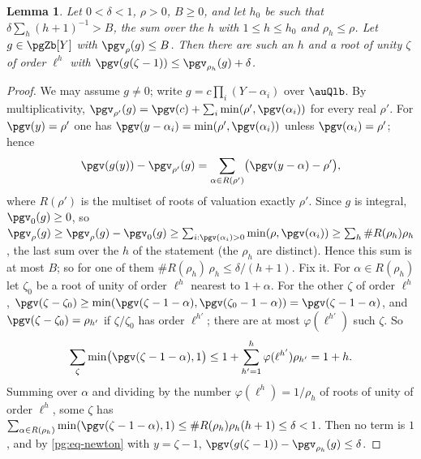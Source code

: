 \documentclass[10pt]{amsart}
\newtheorem{lemma}[theorem]{Lemma}
\theoremstyle{definition}
\theoremstyle{remark}
\begin{document}
\begin{lemma}\label{pg:roots1}
Let $0<\delta<1$, $\rho>0$, $B\ge0$, and let $h_0$ be such that $\delta\sum_h(h+1)^{-1}>B$, the
sum over the $h$ with $1\le h\le h_0$ and $\rho_h\le\rho$. Let $g\in\pgZb[Y]$ with
$\pgv_\rho(g)\le B$. Then there are such an $h$ and a root of unity $\zeta$ of order $\ell^h$ with
$\pgv(g(\zeta-1))\le\pgv_{\rho_h}(g)+\delta$.
\end{lemma}
\begin{proof}
We may assume $g\ne0$; write $g=c\prod_i(Y-\alpha_i)$ over $\auQlb$. By multiplicativity,
$\pgv_{\rho'}(g)=\pgv(c)+\sum_i\min(\rho',\pgv(\alpha_i))$ for every real $\rho'$. For $\pgv(y)=\rho'$ one has $\pgv(y-\alpha_i)=\min(\rho',\pgv(
\alpha_i))$ unless $\pgv(\alpha_i)=\rho'$; hence
\begin{equation}\label{pg:eq-newton}
\pgv(g(y))-\pgv_{\rho'}(g)=\sum_{\alpha\in R(\rho')}\bigl(\pgv(y-\alpha)-\rho'\bigr),
\end{equation}
where $R(\rho')$ is the multiset of roots of valuation exactly $\rho'$. Since $g$ is integral, $\pgv_0(g)\ge0$, so $\pgv_\rho(g)\ge\pgv_\rho(g)-\pgv_0(g)\ge
\sum_{i:\pgv(\alpha_i)>0}\min(\rho,\pgv(\alpha_i))\ge\sum_h\#R(\rho_h)\rho_h$, the last sum over
the $h$ of the statement (the $\rho_h$ are distinct). Hence this sum is at most $B$; so for one
of them $\#R(\rho_h)\,\rho_h\le\delta/(h+1)$. Fix it. For $\alpha\in R(\rho_h)$ let $\zeta_0$ be a
root of unity of order $\ell^h$ nearest to $1+\alpha$. For the other $\zeta$ of order $\ell^h$,
$\pgv(\zeta-\zeta_0)\ge\min(\pgv(\zeta-1-\alpha),\pgv(\zeta_0-1-\alpha))=\pgv(\zeta-1-\alpha)$, and $\pgv(\zeta-\zeta_0)=\rho_{h'}$ if
$\zeta/\zeta_0$ has order $\ell^{h'}$; there are at most $\varphi(\ell^{h'})$ such $\zeta$. So
\[
\sum_{\zeta}\min\bigl(\pgv(\zeta-1-\alpha),1\bigr)\le1+\sum_{h'=1}^{h}\varphi(\ell^{h'})\rho_{h'}
=1+h .
\]
Summing over $\alpha$ and dividing by the number $\varphi(\ell^h)=1/\rho_h$ of roots of unity of
order $\ell^h$, some $\zeta$ has $\sum_{\alpha\in R(\rho_h)}\min(\pgv(\zeta-1-\alpha),1)\le
\#R(\rho_h)\rho_h(h+1)\le\delta<1$. Then no term is $1$, and by \eqref{pg:eq-newton} with
$y=\zeta-1$, $\pgv(g(\zeta-1))-\pgv_{\rho_h}(g)\le\delta$.
\end{proof}
\end{document}
